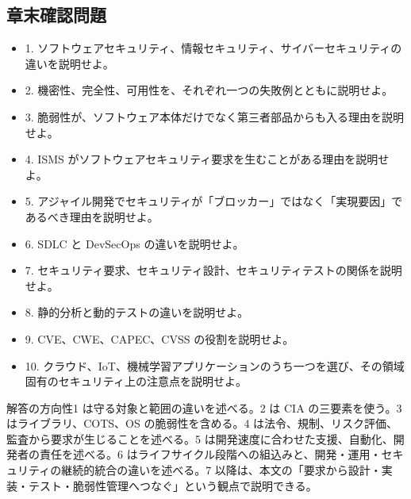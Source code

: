 \subsection{章末確認問題}
\begin{itemize}[leftmargin=2em]
\item 1. ソフトウェアセキュリティ、情報セキュリティ、サイバーセキュリティの違いを説明せよ。
\item 2. 機密性、完全性、可用性を、それぞれ一つの失敗例とともに説明せよ。
\item 3. 脆弱性が、ソフトウェア本体だけでなく第三者部品からも入る理由を説明せよ。
\item 4. ISMS がソフトウェアセキュリティ要求を生むことがある理由を説明せよ。
\item 5. アジャイル開発でセキュリティが「ブロッカー」ではなく「実現要因」であるべき理由を説明せよ。
\item 6. SDLC と DevSecOps の違いを説明せよ。
\item 7. セキュリティ要求、セキュリティ設計、セキュリティテストの関係を説明せよ。
\item 8. 静的分析と動的テストの違いを説明せよ。
\item 9. CVE、CWE、CAPEC、CVSS の役割を説明せよ。
\item 10. クラウド、IoT、機械学習アプリケーションのうち一つを選び、その領域固有のセキュリティ上の注意点を説明せよ。
\end{itemize}
\begin{notebox}{解答の方向性}1 は守る対象と範囲の違いを述べる。2 は CIA の三要素を使う。3 はライブラリ、COTS、OS の脆弱性を含める。4 は法令、規制、リスク評価、監査から要求が生じることを述べる。5 は開発速度に合わせた支援、自動化、開発者の責任を述べる。6 はライフサイクル段階への組込みと、開発・運用・セキュリティの継続的統合の違いを述べる。7 以降は、本文の「要求から設計・実装・テスト・脆弱性管理へつなぐ」という観点で説明できる。\end{notebox}
